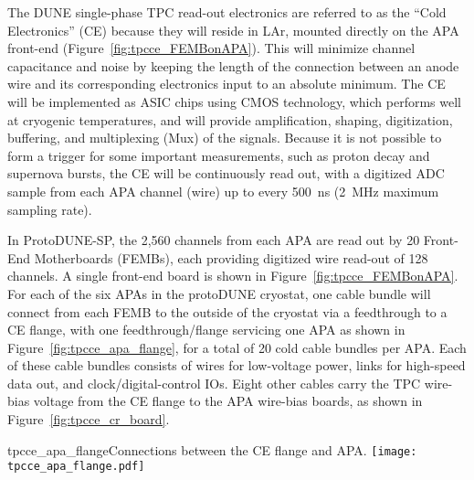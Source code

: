 The DUNE single-phase TPC read-out electronics are referred to as the ``Cold Electronics'' (CE) because they will reside in LAr,
mounted directly on the APA front-end (Figure~\ref{fig:tpcce_FEMBonAPA}).
This will minimize channel capacitance and noise by keeping the length of the connection between an anode wire
and its corresponding electronics input to an absolute minimum.
The CE will be implemented as ASIC chips using CMOS technology,
which performs well at cryogenic temperatures,
and will provide amplification, shaping, digitization, buffering, and multiplexing (Mux) of the signals.
Because it is not possible to form a trigger for some important measurements,
such as proton decay and supernova bursts, the CE will be continuously read out,
with a digitized ADC sample from each APA channel (wire) up to every 500~ns (2~MHz maximum sampling rate).

In ProtoDUNE-SP, the 2,560 channels from each APA are read out by 20 Front-End Motherboards (FEMBs), each providing 
digitized wire read-out of 128 channels. A single front-end board is shown in Figure~\ref{fig:tpcce_FEMBonAPA}.
For each of the six APAs in the protoDUNE cryostat, one cable bundle will 
connect from each FEMB to the outside of the cryostat via a feedthrough to a CE flange, with one 
feedthrough/flange servicing one APA as shown in Figure~\ref{fig:tpcce_apa_flange},
for a total of 20 cold cable bundles per APA. 
Each of these cable bundles consists of wires for low-voltage power, links for high-speed data out,
and clock/digital-control IOs.
Eight other cables carry the TPC wire-bias voltage from the CE flange to the APA wire-bias boards, as
shown in Figure~\ref{fig:tpcce_cr_board}.

\begin{cdrfigure}{tpcce_apa_flange}{Connections between
the CE flange and APA.}
\texttt{[image: tpcce\_apa\_flange.pdf]}
\end{cdrfigure}

